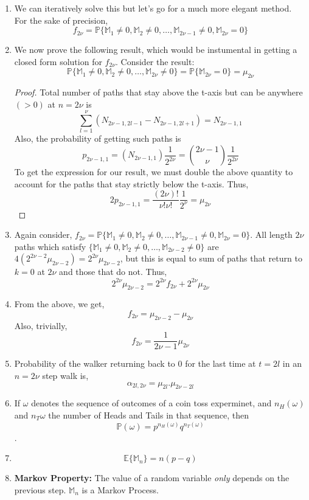 \begin{enumerate}
    \item We can iteratively solve this but let's go for a much more elegant method. For the sake of precision, $$f_{2\nu} = \mathbb{P} \{\mathbb{M}_1 \ne 0, \mathbb{M}_2  \ne 0, \dots, \mathbb{M}_{2\nu -1} \ne 0, \mathbb{M}_{2\nu} = 0\}$$
    \item We now prove the following result, which would be instumental in getting a closed form solution for $f_{2 \nu}$. Consider the result: $$\mathbb{P} \{\mathbb{M}_1 \ne 0, \mathbb{M}_2 \ne 0, \dots, \mathbb{M}_{2\nu} \ne 0 \} = \mathbb{P} \{\mathbb{M}_{2 \nu} = 0\} = \mu_{2\nu}$$
    \begin{proof}
        Total number of paths that stay above the t-axis but can be anywhere $(> 0)$ at $n = 2\nu$ is $$\sum_{l = 1}^{\nu} (N_{2\nu - 1, 2l-1} - N_{2 \nu -1, 2l+1}) = N_{2\nu  -1, 1}$$
        Also, the probability of getting such paths is $$p_{2\nu-1, 1} = (N_{2\nu-1, 1} )\frac{1}{2^{2\nu}} = {2\nu -1 \choose \nu} \frac{1}{2^{2\nu}}$$
        To get the expression for our result, we must double the above quantity to account for the paths that stay strictly below the t-axis. Thus, $$2 p_{2\nu-1, 1} = \frac{(2\nu)!}{\nu! \nu!} \frac{1}{2^\nu} = \mu_{2\nu}$$
    \end{proof}
    \item Again consider, $f_{2\nu} = \mathbb{P} \{\mathbb{M}_1 \ne 0, \mathbb{M}_2  \ne 0, \dots, \mathbb{M}_{2\nu -1} \ne 0, \mathbb{M}_{2\nu} = 0\}$. All length $2\nu$ paths which satisfy $\{\mathbb{M}_1 \ne 0, \mathbb{M}_2  \ne 0, \dots, \mathbb{M}_{2\nu -2} \ne 0\}$ are $4 (2^{2\nu - 2} \mu_{2\nu - 2}) = 2^{2\nu} \mu_{2\nu - 2}$, but this is equal to sum of paths that return to $k = 0$ at $2\nu$ and those that do not. Thus, $$2^{2\nu} \mu_{2\nu -2} = 2^{2\nu} f_{2\nu} + 2^{2\nu} \mu_{2\nu}$$
    \item From the above, we get, $$f_{2\nu} = \mu_{2\nu - 2} - \mu_{2\nu}$$ Also, trivially, $$f_{2\nu} = \frac{1}{2\nu -1} \mu_{2\nu}$$
    \item Probability of the walker returning back to $0$ for the last time at $t=2l$ in an $n = 2\nu$ step walk is, $$\alpha_{2l, 2\nu} = \mu_{2l} . \mu_{2\nu - 2l}$$
    \item If $\omega$ denotes the sequence of outcomes of a coin toss experminet, and $n_H(\omega)$ and $n_T{\omega}$ the number of Heads and Tails in that sequence, then $$\mathbb{P}(\omega) = p^{n_H(\omega)} q^{n_T(\omega)}$$. 
    \item $$\mathbb{E} \{\mathbb{M}_n\} = n(p-q)$$
    \item \textbf{Markov Property:} The value of a random variable \textit{only} depends on the previous step. $\mathbb{M}_n$ is a Markov Process.

\end{enumerate}
